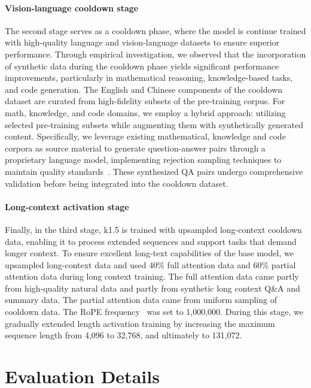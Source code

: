 \documentclass{article}
\newcommand{\citep}[1]{\parencite{#1}}
\begin{document}
\paragraph{Vision-language cooldown stage}
The second stage serves as a cooldown phase, where the model is continue trained with high-quality language and vision-language datasets to ensure superior performance. 
Through empirical investigation, we observed that the incorporation of synthetic data during the cooldown phase yields significant performance improvements, particularly in mathematical reasoning, knowledge-based tasks, and code generation.
The English and Chinese components of the cooldown dataset are curated from high-fidelity subsets of the pre-training corpus. For math, knowledge, and code domains, we employ a hybrid approach: utilizing selected pre-training subsets while augmenting them with synthetically generated content. Specifically, we leverage existing mathematical, knowledge and code corpora as source material to generate question-answer pairs through a proprietary language model, implementing rejection sampling techniques to maintain quality standards~\citep{yue2023mammoth,su2024nemotron}. These synthesized QA pairs undergo comprehensive validation before being integrated into the cooldown dataset.


\paragraph{Long-context activation stage}
Finally, in the third stage, k1.5 is trained with upsampled long-context cooldown data, enabling it to process extended sequences and support tasks that demand longer context. To ensure excellent long-text capabilities of the base model, we upsampled long-context data and used 40\% full attention data and 60\% partial attention data during long context training. The full attention data came partly from high-quality natural data and partly from synthetic long context Q\&A and summary data. The partial attention data came from uniform sampling of cooldown data.
The RoPE frequency~\citep{su2024roformer} was set to 1,000,000. During this stage, we gradually extended length activation training by increasing the maximum sequence length from 4,096 to 32,768, and ultimately to 131,072.


\section{Evaluation Details}
\label{sec:appendix_eval_detail}
\end{document}
